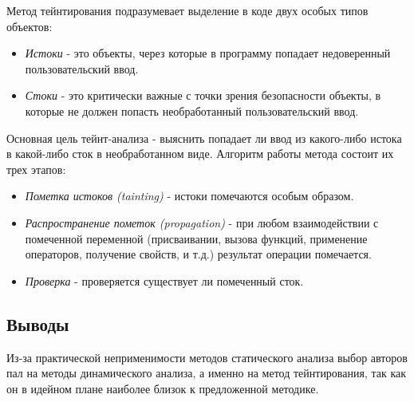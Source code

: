 	Метод тейнтирования подразумевает выделение в коде двух особых типов объектов:
	\begin{itemize}
		\item \textit{Истоки} - это объекты, через которые в программу попадает недоверенный пользовательский ввод.
		\item \textit{Стоки} - это критически важные с точки зрения безопасности объекты, в которые не должен попасть необработанный пользовательский ввод.
	\end{itemize}
	\bigskip

	Основная цель тейнт-анализа - выяснить попадает ли ввод из какого-либо истока в какой-либо сток в необработанном виде. Алгоритм работы метода состоит их трех этапов:

	\begin{itemize}
		\item \textit{Пометка истоков (tainting)} - истоки помечаются особым образом.
		\item \textit{Распространение пометок (propagation)} - при любом взаимодействии с помеченной переменной (присваивании, вызова функций, применение операторов, получение свойств, и т.д.) результат операции помечается.
		\item \textit{Проверка} - проверяется существует ли помеченный сток.
	\end{itemize}


\subsection{Выводы}
	Из-за практической неприменимости методов статического анализа выбор авторов пал на методы динамического анализа, а именно на метод тейнтирования, так как он в идейном плане наиболее близок к предложенной методике.






